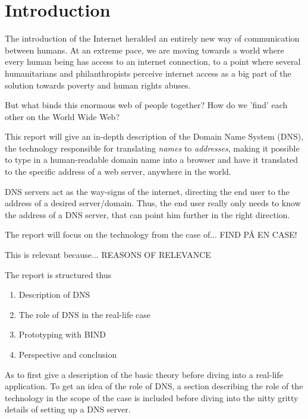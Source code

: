 \chapter{Introduction}
The introduction of the Internet heralded an entirely new way of communication between humans. At an extreme pace, we are moving towards a world where every human being has access to an internet connection, to a point where several humanitarians and philanthropists perceive internet access as a big part of the solution towards poverty and human rights abuses.

But what binds this enormous web of people together? How do we 'find' each other on the World Wide Web?

This report will give an in-depth description of the Domain Name System (DNS), the technology responsible for translating \textit{names} to \textit{addresses}, making it possible to type in a human-readable domain name into a browser and have it translated to the specific address of a web server, anywhere in the world.

DNS servers act as the way-signs of the internet, directing the end user to the address of a desired server/domain. Thus, the end user really only needs to know the address of a DNS server, that can point him further in the right direction.

The report will focus on the technology from the case of... FIND PÅ EN CASE!

This is relevant because... REASONS OF RELEVANCE

The report is structured thus
\begin{enumerate}
\item Description of DNS
\item The role of DNS in the real-life case
\item Prototyping with BIND
\item Perspective and conclusion
\end{enumerate}

As to first give a description of the basic theory before diving into a real-life application. To get an idea of the role of DNS, a section describing the role of the technology in the scope of the case is included before diving into the nitty gritty details of setting up a DNS server.